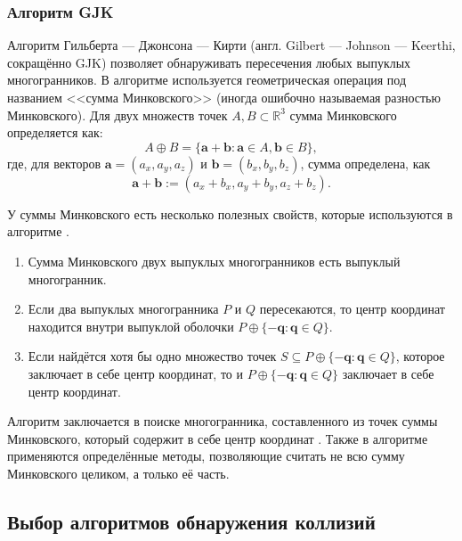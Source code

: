 \subsubsection{Алгоритм GJK}

Алгоритм Гильберта --- Джонсона --- Кирти (англ. Gilbert --- Johnson --- Keerthi, сокращённо GJK) позволяет обнаруживать пересечения любых выпуклых многогранников.
В алгоритме используется геометрическая операция под названием <<сумма Минковского>> (иногда ошибочно называемая разностью Минковского). %
Для двух множеств точек $A, B \subset \mathbb{R}^3$ сумма Минковского определяется как:
$$
A \oplus B = \{ \boldsymbol{a} + \boldsymbol{b} : \boldsymbol{a} \in A, \boldsymbol{b} \in B \},
$$
где, для векторов $\boldsymbol{a} = (a_x, a_y, a_z)$ и $\boldsymbol{b} = (b_x, b_y, b_z)$, сумма определена, как
$$
\boldsymbol{a} + \boldsymbol{b} := (a_x + b_x, a_y + b_y, a_z + b_z).
$$

У суммы Минковского есть несколько полезных свойств, которые используются в алгоритме \cite{minkowski}.
\begin{enumerate}
    \item Сумма Минковского двух выпуклых многогранников есть выпуклый многогранник.
    \item Если два выпуклых многогранника $P$ и $Q$ пересекаются, то центр координат находится внутри выпуклой оболочки $P \oplus \{ -\boldsymbol{q} : \boldsymbol{q} \in Q \}$.
    \item Если найдётся хотя бы одно множество точек $S \subseteq P \oplus \{ -\boldsymbol{q} : \boldsymbol{q} \in Q \}$, которое заключает в себе центр координат, то и $P \oplus \{ -\boldsymbol{q} : \boldsymbol{q} \in Q \}$ заключает в себе центр координат.
\end{enumerate}

Алгоритм заключается в поиске многогранника, составленного из точек суммы Минковского, который содержит в себе центр координат \cite{gjksm}.
Также в алгоритме применяются определённые методы, позволяющие считать не всю сумму Минковского целиком, а только её часть.

\subsection*{Выбор алгоритмов обнаружения коллизий}

